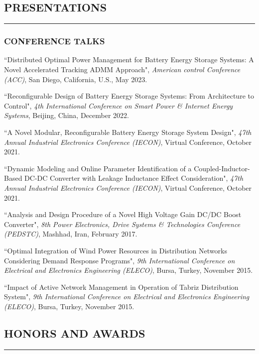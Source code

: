 \documentclass[10pt,letter]{article}
\newcounter{myEnumCounter}
\newcounter{mySaveCounter}
\renewenvironment{enumerate}{%
  \begin{list}{\arabic{myEnumCounter}.}{\usecounter{myEnumCounter}%
  \setcounter{myEnumCounter}{\value{mySaveCounter}}}
  }{%
  \setcounter{mySaveCounter}{\value{myEnumCounter}}\end{list}%
}
\begin{document}
\begin{small}
\subsection*{PRESENTATIONS}
\hrule
\vspace{0.2cm}

\subsubsection*{CONFERENCE TALKS}
\begin{enumerate}
    \item 
       ``Distributed Optimal Power Management for Battery Energy Storage Systems: A Novel Accelerated Tracking ADMM Approach",
       {\it American control Conference (ACC)}, San Diego, California, U.S., May 2023. 
    \item 
       ``Reconfigurable Design of Battery Energy Storage Systems: From Architecture to Control",
       {\it 4th International Conference on Smart Power \& Internet Energy Systems}, Beijing, China, December 2022. 
    \item 
       ``A Novel Modular, Reconfigurable Battery Energy Storage System Design",
       {\it 47th Annual Industrial Electronics Conference (IECON)}, Virtual Conference, October 2021.
    \item 
       ``Dynamic Modeling and Online Parameter Identification of a Coupled-Inductor-Based DC-DC Converter with Leakage Inductance Effect Consideration",
       {\it 47th Annual Industrial Electronics Conference (IECON)}, Virtual Conference, October 2021.
    \item 
       ``Analysis and Design Procedure of a Novel High Voltage Gain DC/DC Boost Converter",
       {\it 8th Power Electronics, Drive Systems \& Technologies Conference (PEDSTC)}, Mashhad, Iran, February 2017.
    \item 
       ``Optimal Integration of Wind Power Resources in Distribution Networks Considering Demand Response Programs",
       {\it 9th International Conference on Electrical and Electronics Engineering (ELECO)}, Bursa, Turkey, November 2015. 
    \item 
       ``Impact of Active Network Management in Operation of Tabriz Distribution System",
       {\it 9th International Conference on Electrical and Electronics Engineering (ELECO)}, Bursa, Turkey, November 2015. 
\end{enumerate}

\subsection*{HONORS AND AWARDS}
\hrule
\vspace{0.2cm}


\end{small}
\end{document}
